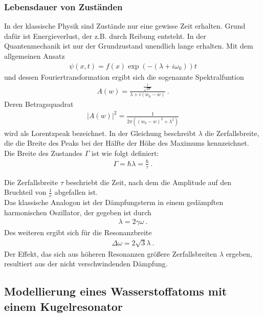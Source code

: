 \subsubsection{Lebensdauer von Zuständen}
\label{sec:Lebensdauer von Zuständen}
In der klassische Physik sind Zustände nur eine gewisse Zeit erhalten. Grund dafür ist Energieverlust, der z.B. durch Reibung entsteht. In der Quantenmechanik ist nur der Grundzustand unendlich lange erhalten. Mit dem allgemeinen Ansatz
\begin{align}
  \psi(x,t)= f(x)\exp{(-(\lambda+ i\omega_0))t}
\end{align}
und dessen Fouriertransformation ergibt sich die sogenannte Spektralfuntion
\begin{align}
  A(w) = \frac{\frac{1}{\sqrt{2\pi}}}{\lambda+i(w_0-w)} \:.
  \label{eq:Spekfkt}
\end{align}
Deren Betragsquadrat
\begin{align}
  |A(w)|^2 = \frac{1}{2\pi \left((w_0-w)^2 +\lambda^2 \right)}
  \label{eq:BtgSpekfkt}
\end{align}
wird als Lorentzpeak bezeichnet. In der Gleichung beschreibt $\lambda$ die Zerfallsbreite, die die Breite des Peaks bei der Hälfte der Höhe des Maximums kennzeichnet. Die Breite des Zustandes $\Gamma$ ist wie folgt definiert:
\begin{align}
    \Gamma = \hbar \lambda = \frac{\hbar}{\tau}\:.
    \label{eq:Breite}
\end{align}

Die Zerfallsbreite $\tau$ beschriebt die Zeit, nach dem die Amplitude auf den Bruchteil von $\frac{1}{e}$ abgefallen ist.\\
Das klassische Analogon ist der Dämpfungsterm in einem gedämpften harmonischen Oszillator, der gegeben ist durch
\begin{align}
    \lambda =2\gamma \omega \:.
    \label{eq:lambda}
\end{align}
Des weiteren ergibt sich für die Resonanzbreite
\begin{align}
  \Delta \omega =2\sqrt{3}\lambda\:.
  \label{eq:omega}
\end{align}
Der Effekt, das sich aus höheren Resonanzen größere Zerfallsbreiten $\lambda$ ergeben, resultiert aus der nicht verschwindenden Dämpfung.\\
\subsection{Modellierung eines Wasserstoffatoms mit einem Kugelresonator}
\label{sec:Modellierung eines Wasserstoffatoms mit einem sphärischen Resonator}

